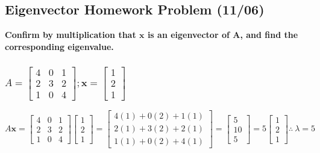 \documentclass[
  letterpaper,
  DIV=11,
  numbers=noendperiod]{scrartcl}
\begin{document}
\hypertarget{eigenvector-homework-problem-1106}{%
\subsection{Eigenvector Homework Problem
(11/06)}\label{eigenvector-homework-problem-1106}}

\textbf{Confirm by multiplication that \(\symbf{x}\) is an eigenvector
of \(\symbf{A}\), and find the corresponding eigenvalue.}

\hypertarget{a-beginbmatrix4-0-1-2-3-2-1-0-4-endbmatrix-symbfx-beginbmatrix1-2-1endbmatrix}{%
\subsubsection{\texorpdfstring{\(A = \begin{bmatrix}4 & 0 & 1 \\ 2 & 3 & 2 \\ 1 & 0 & 4 \end{bmatrix}; \symbf{x} = \begin{bmatrix}1 \\ 2 \\ 1\end{bmatrix}\)}{A = \textbackslash begin\{bmatrix\}4 \& 0 \& 1 \textbackslash\textbackslash{} 2 \& 3 \& 2 \textbackslash\textbackslash{} 1 \& 0 \& 4 \textbackslash end\{bmatrix\}; \textbackslash symbf\{x\} = \textbackslash begin\{bmatrix\}1 \textbackslash\textbackslash{} 2 \textbackslash\textbackslash{} 1\textbackslash end\{bmatrix\}}}\label{a-beginbmatrix4-0-1-2-3-2-1-0-4-endbmatrix-symbfx-beginbmatrix1-2-1endbmatrix}}

\(A\symbf{x} = \begin{bmatrix}4 & 0 & 1 \\ 2 & 3 & 2 \\ 1 & 0 & 4 \end{bmatrix}\begin{bmatrix}1 \\ 2 \\ 1\end{bmatrix} = \begin{bmatrix}4(1)+0(2)+1(1) \\ 2(1)+3(2)+2(1) \\ 1(1)+0(2)+4(1)\end{bmatrix} = \begin{bmatrix}5 \\ 10 \\ 5\end{bmatrix} = 5\begin{bmatrix}1 \\ 2 \\ 1\end{bmatrix} \therefore \ \lambda = 5\)
\end{document}
